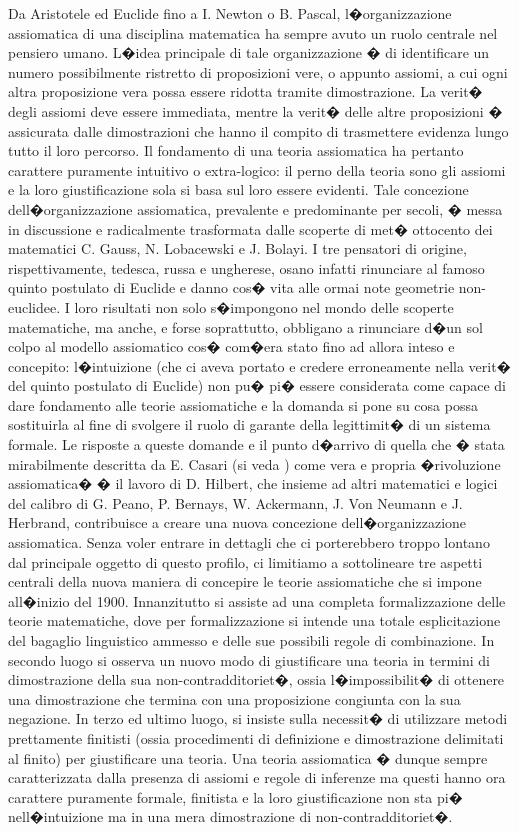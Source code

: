 \documentclass[a4paper,12pt]{aphex}
\begin{document}
Da Aristotele ed Euclide fino a I. Newton o B. Pascal, l�organizzazione assiomatica di una disciplina matematica ha sempre avuto un ruolo centrale nel pensiero umano. L�idea principale di tale organizzazione � di identificare un numero possibilmente ristretto di proposizioni vere, o appunto assiomi, a cui ogni altra proposizione vera possa essere ridotta tramite dimostrazione.  La verit� degli assiomi deve essere immediata, mentre la verit� delle altre proposizioni � assicurata dalle dimostrazioni che hanno il compito di trasmettere evidenza lungo tutto il loro percorso. Il fondamento di una teoria assiomatica ha pertanto carattere puramente intuitivo o extra-logico: il perno della teoria sono gli assiomi e la loro giustificazione sola si basa sul loro essere evidenti. 
Tale concezione dell�organizzazione assiomatica, prevalente e predominante per secoli, � messa in discussione e radicalmente trasformata dalle scoperte di met� ottocento dei matematici C. Gauss, N. Lobacewski e J. Bolayi. I tre pensatori di origine, rispettivamente, tedesca, russa e ungherese, osano infatti rinunciare al famoso quinto postulato di Euclide e danno cos� vita alle ormai note geometrie non-euclidee. I loro risultati non solo s�impongono nel mondo delle scoperte matematiche, ma anche, e forse soprattutto, obbligano a rinunciare d�un sol colpo al modello assiomatico cos� com�era stato fino ad allora inteso e concepito:  l�intuizione (che ci aveva portato e credere erroneamente nella verit� del quinto postulato di Euclide) non pu� pi� essere considerata come capace di dare fondamento alle teorie assiomatiche e la domanda si pone su cosa possa sostituirla al fine di svolgere il ruolo di garante della legittimit� di un sistema formale. 
Le risposte a queste domande e il punto d�arrivo di quella che � stata mirabilmente descritta da E. Casari (si veda \cite{casari}) come vera e propria �rivoluzione assiomatica� � il lavoro di D. Hilbert, che insieme ad altri matematici e logici del calibro di G. Peano, P. Bernays,  W. Ackermann, J. Von Neumann e J. Herbrand, contribuisce a creare una nuova concezione dell�organizzazione assiomatica. 
Senza voler entrare in dettagli che ci porterebbero troppo lontano dal principale oggetto di questo profilo, ci limitiamo a sottolineare tre aspetti centrali della nuova maniera di concepire le teorie assiomatiche che si impone all�inizio del 1900. Innanzitutto si assiste ad una completa formalizzazione delle teorie matematiche, dove per formalizzazione si intende una totale esplicitazione del bagaglio linguistico ammesso e delle sue possibili regole di combinazione. In secondo luogo si osserva un nuovo modo di giustificare una teoria in termini di dimostrazione della sua non-contradditoriet�, ossia l�impossibilit� di ottenere una dimostrazione che termina con una proposizione congiunta con la sua negazione. In terzo ed ultimo luogo, si  insiste sulla necessit� di utilizzare metodi prettamente finitisti (ossia procedimenti di definizione e dimostrazione delimitati al finito) per giustificare una teoria. Una teoria assiomatica � dunque sempre caratterizzata dalla presenza di assiomi e regole di inferenze ma questi hanno ora carattere puramente formale, finitista e la loro giustificazione non sta pi� nell�intuizione ma in una mera dimostrazione di non-contradditoriet�.
\end{document}
